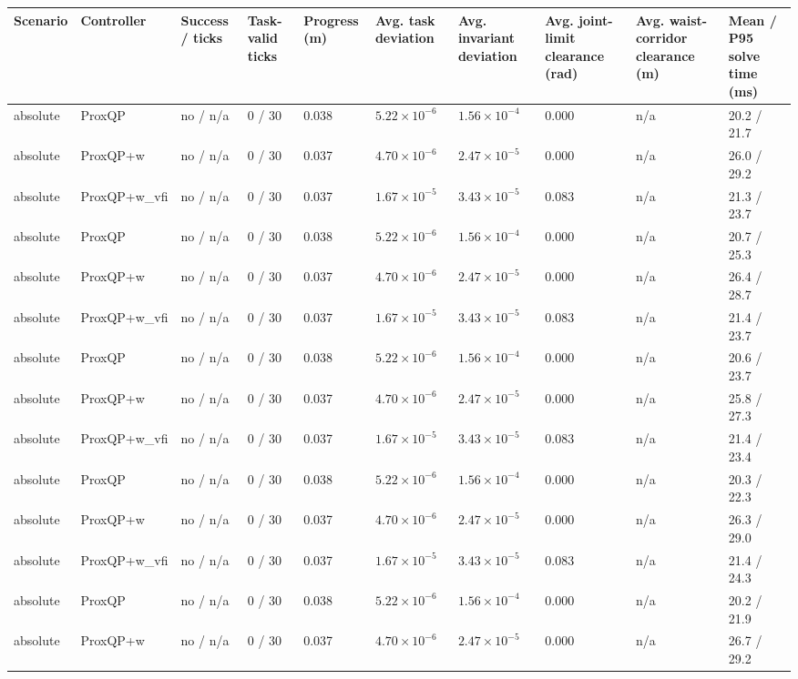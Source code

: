 \begin{tabular}{llllllllll}
\toprule
Scenario & Controller & Success / ticks & Task-valid ticks & Progress (m) & Avg. task deviation & Avg. invariant deviation & Avg. joint-limit clearance (rad) & Avg. waist-corridor clearance (m) & Mean / P95 solve time (ms) \\
\midrule
absolute & ProxQP & no / n/a & 0 / 30 & 0.038 & $5.22\times 10^{-6}$ & $1.56\times 10^{-4}$ & 0.000 & n/a & 20.2 / 21.7 \\
absolute & ProxQP+w & no / n/a & 0 / 30 & 0.037 & $4.70\times 10^{-6}$ & $2.47\times 10^{-5}$ & 0.000 & n/a & 26.0 / 29.2 \\
absolute & ProxQP+w\_vfi & no / n/a & 0 / 30 & 0.037 & $1.67\times 10^{-5}$ & $3.43\times 10^{-5}$ & 0.083 & n/a & 21.3 / 23.7 \\
absolute & ProxQP & no / n/a & 0 / 30 & 0.038 & $5.22\times 10^{-6}$ & $1.56\times 10^{-4}$ & 0.000 & n/a & 20.7 / 25.3 \\
absolute & ProxQP+w & no / n/a & 0 / 30 & 0.037 & $4.70\times 10^{-6}$ & $2.47\times 10^{-5}$ & 0.000 & n/a & 26.4 / 28.7 \\
absolute & ProxQP+w\_vfi & no / n/a & 0 / 30 & 0.037 & $1.67\times 10^{-5}$ & $3.43\times 10^{-5}$ & 0.083 & n/a & 21.4 / 23.7 \\
absolute & ProxQP & no / n/a & 0 / 30 & 0.038 & $5.22\times 10^{-6}$ & $1.56\times 10^{-4}$ & 0.000 & n/a & 20.6 / 23.7 \\
absolute & ProxQP+w & no / n/a & 0 / 30 & 0.037 & $4.70\times 10^{-6}$ & $2.47\times 10^{-5}$ & 0.000 & n/a & 25.8 / 27.3 \\
absolute & ProxQP+w\_vfi & no / n/a & 0 / 30 & 0.037 & $1.67\times 10^{-5}$ & $3.43\times 10^{-5}$ & 0.083 & n/a & 21.4 / 23.4 \\
absolute & ProxQP & no / n/a & 0 / 30 & 0.038 & $5.22\times 10^{-6}$ & $1.56\times 10^{-4}$ & 0.000 & n/a & 20.3 / 22.3 \\
absolute & ProxQP+w & no / n/a & 0 / 30 & 0.037 & $4.70\times 10^{-6}$ & $2.47\times 10^{-5}$ & 0.000 & n/a & 26.3 / 29.0 \\
absolute & ProxQP+w\_vfi & no / n/a & 0 / 30 & 0.037 & $1.67\times 10^{-5}$ & $3.43\times 10^{-5}$ & 0.083 & n/a & 21.4 / 24.3 \\
absolute & ProxQP & no / n/a & 0 / 30 & 0.038 & $5.22\times 10^{-6}$ & $1.56\times 10^{-4}$ & 0.000 & n/a & 20.2 / 21.9 \\
absolute & ProxQP+w & no / n/a & 0 / 30 & 0.037 & $4.70\times 10^{-6}$ & $2.47\times 10^{-5}$ & 0.000 & n/a & 26.7 / 29.2 \\

\end{tabular}
